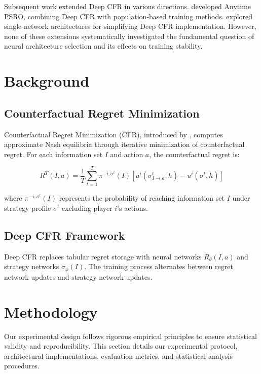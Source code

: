 \documentclass[10pt,twocolumn]{article}
\theoremstyle{definition}
\begin{document}
Subsequent work extended Deep CFR in various directions. \citet{mcaleer2022anytime} developed Anytime PSRO, combining Deep CFR with population-based training methods. \citet{steinberger2019single} explored single-network architectures for simplifying Deep CFR implementation. However, none of these extensions systematically investigated the fundamental question of neural architecture selection and its effects on training stability.

\section{Background}

\subsection{Counterfactual Regret Minimization}
Counterfactual Regret Minimization (CFR), introduced by \citet{zinkevich2007regret}, computes approximate Nash equilibria through iterative minimization of counterfactual regret. For each information set $I$ and action $a$, the counterfactual regret is:

\begin{equation}
R^T(I,a) = \frac{1}{T} \sum_{t=1}^T \pi^{-i,\sigma^t}(I) [u^i(\sigma^t_{I \to a}, h) - u^i(\sigma^t, h)]
\end{equation}

where $\pi^{-i,\sigma^t}(I)$ represents the probability of reaching information set $I$ under strategy profile $\sigma^t$ excluding player $i$'s actions.

\subsection{Deep CFR Framework}
Deep CFR replaces tabular regret storage with neural networks $R_\theta(I,a)$ and strategy networks $\sigma_\phi(I)$. The training process alternates between regret network updates and strategy network updates.

\section{Methodology}\label{sec:methodology}

Our experimental design follows rigorous empirical principles to ensure statistical validity and reproducibility. This section details our experimental protocol, architectural implementations, evaluation metrics, and statistical analysis procedures.
\end{document}
